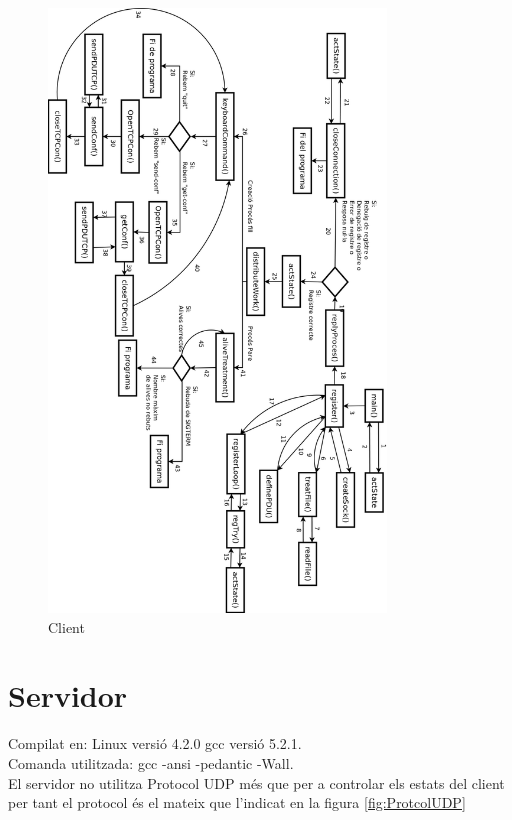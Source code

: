 \documentclass[11pt]{article}
\begin{document}
\begin{figure}[h]
    \includegraphics[width=0.8\textwidth]{Client.png}
    \caption{Client}
    \label{fig:Client}

\end{figure}
\newpage
\section{Servidor}
Compilat en: Linux versió 4.2.0 gcc versió 5.2.1.\\
Comanda utilitzada: gcc -ansi -pedantic -Wall.\\
El servidor no utilitza Protocol UDP més que per a controlar els estats del client per tant el protocol és el mateix que l'indicat en la figura \ref{fig:ProtcolUDP}
\end{document}
